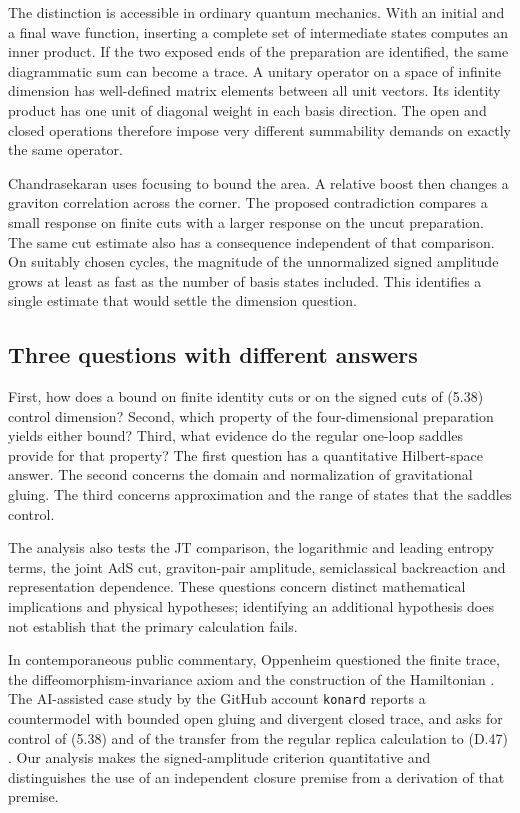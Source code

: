 \documentclass[11pt]{article}
\begin{document}
The distinction is accessible in ordinary quantum mechanics. With an initial and a final wave function, inserting a complete set of intermediate states computes an inner product. If the two exposed ends of the preparation are identified, the same diagrammatic sum can become a trace. A unitary operator on a space of infinite dimension has well-defined matrix elements between all unit vectors. Its identity product has one unit of diagonal weight in each basis direction. The open and closed operations therefore impose very different summability demands on exactly the same operator.

Chandrasekaran uses focusing to bound the area. A relative boost then changes a graviton correlation across the corner. The proposed contradiction compares a small response on finite cuts with a larger response on the uncut preparation. The same cut estimate also has a consequence independent of that comparison. On suitably chosen cycles, the magnitude of the unnormalized signed amplitude grows at least as fast as the number of basis states included. This identifies a single estimate that would settle the dimension question.

\subsection{Three questions with different answers}
First, how does a bound on finite identity cuts or on the signed cuts of (5.38) control dimension? Second, which property of the four-dimensional preparation yields either bound? Third, what evidence do the regular one-loop saddles provide for that property? The first question has a quantitative Hilbert-space answer. The second concerns the domain and normalization of gravitational gluing. The third concerns approximation and the range of states that the saddles control.

The analysis also tests the JT comparison, the logarithmic and leading entropy terms, the joint AdS cut, graviton-pair amplitude, semiclassical backreaction and representation dependence. These questions concern distinct mathematical implications and physical hypotheses; identifying an additional hypothesis does not establish that the primary calculation fails.

In contemporaneous public commentary, Oppenheim questioned the finite trace, the diffeomorphism-invariance axiom and the construction of the Hamiltonian \cite{oppenheim}. The AI-assisted case study by the GitHub account \texttt{konard} reports a countermodel with bounded open gluing and divergent closed trace, and asks for control of (5.38) and of the transfer from the regular replica calculation to (D.47) \cite{konard-audit}. Our analysis makes the signed-amplitude criterion quantitative and distinguishes the use of an independent closure premise from a derivation of that premise.
\end{document}
